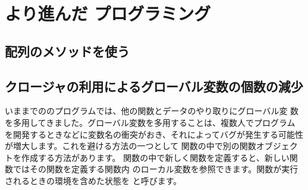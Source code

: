 \section{より進んだ \JS プログラミング}
\subsection{配列のメソッドを使う}

\subsection{クロージャの利用によるグローバル変数の個数の減少}
いままでの\JS のプログラムでは、他の関数とデータのやり取りにグローバル変
数を多用してきました。グローバル変数を多用することは、複数人でプログラム
を開発するときなどに変数名の衝突がおき、それによってバグが発生する可能性
が増大します。これを避ける方法の一つとして%
関数の中で別の関数オブジェクトを作成する方法があります。
関数の中で新しく関数を定義すると、新しい関数ではその関数を定義する関数内
のローカル変数を参照できます。関数が実行されるときの環境を含めた状態を
と呼びます。

